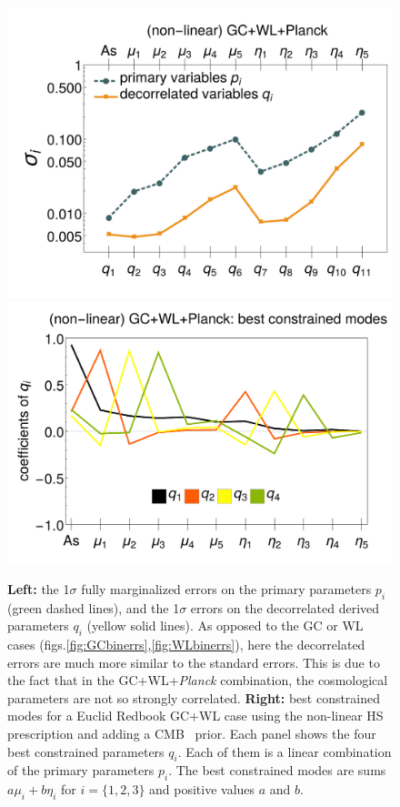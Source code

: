 \begin{figure}[htbp]
	\centering
	\includegraphics[width=0.4\linewidth]{Chapters/linear-nonlinear-MG-forecasts/figures/Decorrelations-GC+WL+Planck/Errors_at_par_index_i--_ZCA_SquareNorm--fiducialMGBin3_Euclid_GC+WL+Planck_nonlinearPk__Zhao_}
	\includegraphics[width=0.4\linewidth]{Chapters/linear-nonlinear-MG-forecasts/figures/Decorrelations-GC+WL+Planck/non-linear_GC+WL+Planck--_best_constrained_modes-Errors_on_q_ZCA_SquareNorm--_fiducialMGBin3_Euclid_GC+WL+Planck_nonlinearPk__Zhao_}
	\caption[1$\sigma$ forecasted errors and best constrained modes for a Euclid GC+WL forecast.]{\label{fig:GC+WL+Planck-bestconst-errspq}
		\textbf{Left:} the 1$\sigma$ fully marginalized errors on the primary parameters $p_i$ (green dashed
		lines), and the 1$\sigma$ errors on the decorrelated derived
		parameters $q_i$ (yellow solid lines). As opposed to the GC or WL cases (figs.\ref{fig:GCbinerrs},\ref{fig:WLbinerrs}), here the decorrelated errors are much more similar to the standard errors.
		This is due to the fact that in the GC+WL+{\it Planck} combination, the cosmological parameters are not so strongly correlated.
		\textbf{Right:} best constrained modes for a Euclid Redbook GC+WL case using the non-linear HS prescription and adding a CMB \planck\ prior.
		Each panel shows the four best constrained parameters $q_i$. Each of them is a linear combination of the primary parameters $p_i$. 
		The best constrained modes are sums $a\mu_i + b\eta_i$ for $i=\{1,2,3\}$ and positive values $a$ and $b$.}
\end{figure}

